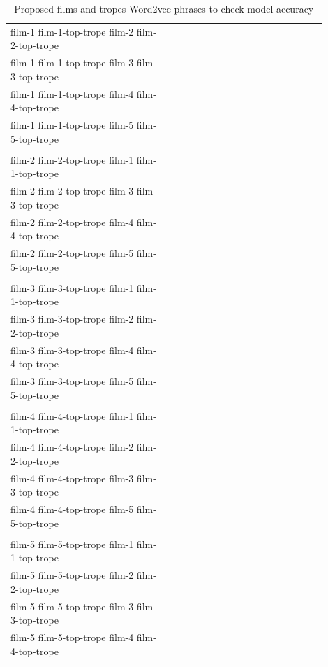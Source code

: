 \documentclass[letterpaper]{article}
\begin{document}
     \begin{table}[ht]
	   \centering
	    \begin{tabular}{|p{0.45\linewidth}|p{0.45\linewidth}|}
		\hline	      
      film-1 film-1-top-trope film-2 film-2-top-trope\\
      film-1 film-1-top-trope film-3 film-3-top-trope\\
      film-1 film-1-top-trope film-4 film-4-top-trope\\
      film-1 film-1-top-trope film-5 film-5-top-trope\\
      \\
      film-2 film-2-top-trope film-1 film-1-top-trope\\
      film-2 film-2-top-trope film-3 film-3-top-trope\\
      film-2 film-2-top-trope film-4 film-4-top-trope\\
      film-2 film-2-top-trope film-5 film-5-top-trope\\
      \\
      film-3 film-3-top-trope film-1 film-1-top-trope\\
      film-3 film-3-top-trope film-2 film-2-top-trope\\
      film-3 film-3-top-trope film-4 film-4-top-trope\\
      film-3 film-3-top-trope film-5 film-5-top-trope\\
      \\
      film-4 film-4-top-trope film-1 film-1-top-trope\\
      film-4 film-4-top-trope film-2 film-2-top-trope\\
      film-4 film-4-top-trope film-3 film-3-top-trope\\
      film-4 film-4-top-trope film-5 film-5-top-trope\\
      \\
      film-5 film-5-top-trope film-1 film-1-top-trope\\
      film-5 film-5-top-trope film-2 film-2-top-trope\\
      film-5 film-5-top-trope film-3 film-3-top-trope\\
      film-5 film-5-top-trope film-4 film-4-top-trope\\
  \hline
\end{tabular}
\caption{Proposed films and tropes Word2vec phrases to check model accuracy}
\label{tab:proposed-films-tropes-phrases-check-accuracy}
\end{table}     
      
\end{document}
